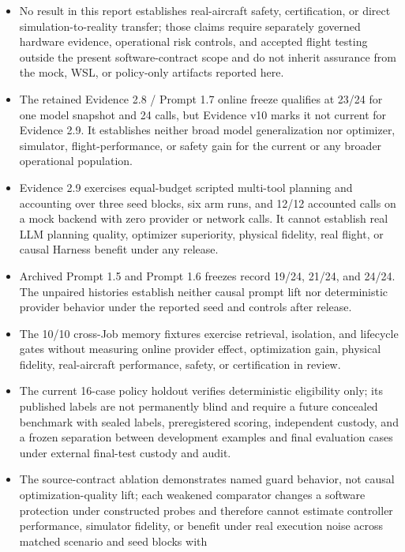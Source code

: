 \begin{itemize}
\item
  No result in this report establishes real-aircraft safety,
  certification, or direct simulation-to-reality transfer; those claims
  require separately governed hardware evidence, operational risk
  controls, and accepted flight testing outside the present
  software-contract scope and do not inherit assurance from the mock,
  WSL, or policy-only artifacts reported here.
\item
  The retained Evidence 2.8 / Prompt 1.7 online freeze qualifies at 23/24
  for one model snapshot and 24 calls, but Evidence v10 marks it not
  current for Evidence 2.9. It establishes neither broad model
  generalization nor optimizer, simulator, flight-performance, or safety
  gain for the current or any broader operational population.
\item
  Evidence 2.9 exercises equal-budget scripted multi-tool planning and
  accounting over three seed blocks, six arm runs, and 12/12 accounted
  calls on a mock backend with zero provider or network calls. It cannot
  establish real LLM planning quality, optimizer superiority, physical
  fidelity, real flight, or causal Harness benefit under any release.
\item
  Archived Prompt 1.5 and Prompt 1.6 freezes record 19/24, 21/24, and
  24/24. The unpaired histories establish neither causal prompt lift nor
  deterministic provider behavior under the reported seed and controls
  after release.
\item
  The 10/10 cross-Job memory fixtures exercise retrieval, isolation, and
  lifecycle gates without measuring online provider effect, optimization
  gain, physical fidelity, real-aircraft performance, safety, or
  certification in review.
\item
  The current 16-case policy holdout verifies deterministic eligibility
  only; its published labels are not permanently blind and require a
  future concealed benchmark with sealed labels, preregistered scoring,
  independent custody, and a frozen separation between development
  examples and final evaluation cases under external final-test custody
  and audit.
\item
  The source-contract ablation demonstrates named guard behavior, not
  causal optimization-quality lift; each weakened comparator changes a
  software protection under constructed probes and therefore cannot
  estimate controller performance, simulator fidelity, or benefit under
  real execution noise across matched scenario and seed blocks with

\end{itemize}
